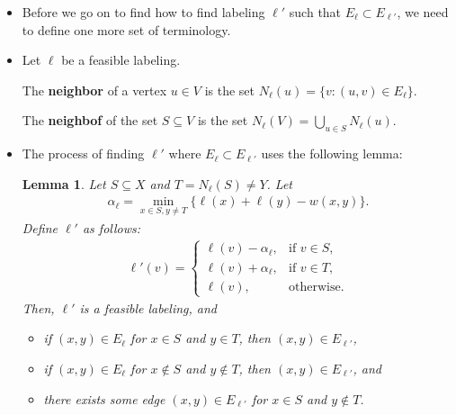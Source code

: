 \documentclass[10pt]{article}
\newtheorem{lemma}{Lemma}[section]
\newcommand{\sseq}{\subseteq}
\begin{document}
\begin{itemize}
    \item Before we go on to find how to find labeling $\ell'$ such that $E_\ell \subset E_{\ell'}$, we need to define one more set of terminology.

    \item Let $\ell$ be a feasible labeling.

    The {\bf neighbor} of a vertex $u \in V$ is the set $N_\ell(u) = \{v : (u,v) \in E_\ell\}$.

    The {\bf neighbof} of the set $S \sseq V$ is the set $N_\ell(V) = \bigcup_{u \in S} N_\ell(u)$.

    \item The process of finding $\ell'$ where $E_{\ell} \subset E_{\ell'}$ uses the following lemma:

    \begin{lemma}
      Let $S \sseq X$ and $T = N_\ell(S) \neq Y$. Let
      \begin{align*}
        \alpha_\ell = \min_{x\in S, y \neq T} \{ \ell(x) + \ell(y) - w(x,y) \}.
      \end{align*}
      Define $\ell'$ as follows:
      \begin{align*}
        \ell'(v) = \begin{cases}
          \ell(v) - \alpha_\ell, & \mbox{if } v \in S,\\
          \ell(v) + \alpha_\ell, & \mbox{if } v \in T,\\
          \ell(v), & \mbox{otherwise.}
        \end{cases}
      \end{align*}
      Then, $\ell'$ is a feasible labeling, and
      \begin{itemize}
        \item if $(x,y) \in E_\ell$ for $x \in S$ and $y \in T$, then $(x,y) \in E_{\ell'}$,
        \item if $(x,y) \in E_\ell$ for $x \not\in S$ and $y \not\in T$, then $(x,y) \in E_{\ell'}$, and
        \item there exists some edge $(x,y) \in E_{\ell'}$ for $x \in S$ and $y \not\in T$.
      \end{itemize}
    \end{lemma}


\end{itemize}
\end{document}
